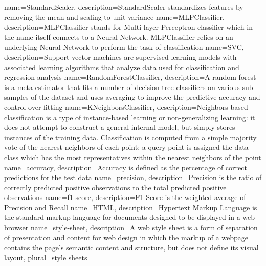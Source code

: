 {
    name={StandardScaler},
    description={StandardScaler standardizes features by removing the mean and scaling to unit variance}
}
{
    name={MLPClassifier},
    description={MLPClassifier stands for Multi-layer Perceptron classifier which in the name itself connects to a Neural Network. MLPClassifier relies on an underlying Neural Network to perform the task of classification}
}
{
    name={SVC},
    description={Support-vector machines are supervised learning models with associated learning algorithms that analyze data used for classification and regression analysis}
}
{
    name={RandomForestClassifier},
    description={A random forest is a meta estimator that fits a number of decision tree classifiers on various sub-samples of the dataset and uses averaging to improve the predictive accuracy and control over-fitting}
}
{
    name={KNeighborsClassifier},
    description={Neighbors-based classification is a type of instance-based learning or non-generalizing learning: it does not attempt to construct a general internal model, but simply stores instances of the training data. Classification is computed from a simple majority vote of the nearest neighbors of each point: a query point is assigned the data class which has the most representatives within the nearest neighbors of the point}
}
{
    name={accuracy},
    description={Accuracy is defined as the percentage of correct predictions for the test data}
}
{
    name={precision},
    description={Precision is the ratio of correctly predicted positive observations to the total predicted positive observations}
}
{
    name={f1-score},
    description={F1 Score is the weighted average of Precision and Recall}
}
{
    name={HTML},
    description={Hypertext Markup Language is the standard markup language for documents designed to be displayed in a web browser}
}
{
    name={style-sheet},
    description={A web style sheet is a form of separation of presentation and content for web design in which the markup of a webpage contains the page's semantic content and structure, but does not define its visual layout},
    plural={style sheets}
}